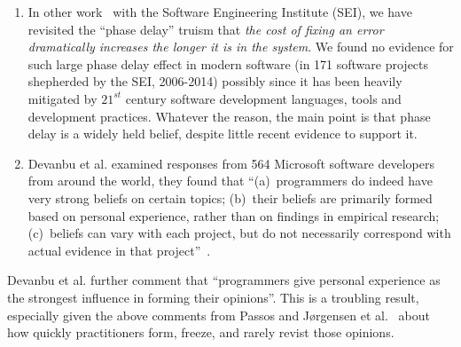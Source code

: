 \documentclass{sig-alternate}
\theoremstyle{break}
\begin{document}
\begin{enumerate} 
\item
In other work~\cite{me16phase} with the Software Engineering Institute (SEI), we have revisited
the ``phase delay'' truism that {\em the cost of fixing an error dramatically increases the longer it is in the system}. 
We found no evidence for such large   phase delay effect in modern
software (in 171 software projects shepherded
by the SEI, 2006-2014) possibly since it has been  heavily mitigated by $21^{st}$ century software development languages, tools and development practices. 
Whatever the reason, the main point  is that phase delay is a widely
held belief, despite little recent evidence to support it.
\item
Devanbu et al.  examined responses from 564 Microsoft software developers from around
the world, they found that  ``(a)~programmers do indeed have very
strong beliefs on certain topics; (b)~their beliefs are primarily formed
based on personal experience, rather than on findings in empirical
research; (c)~beliefs can vary with each project, but do not necessarily
correspond with actual evidence in that project''~\cite{prem16}.
\end{enumerate}
Devanbu et al. further  comment that ``programmers give personal experience
as the strongest influence in forming their opinions''. This is a troubling
result, especially given the above comments from Passos and  J{\o}rgensen et al.~\cite{passos11,jorgensen09} about how quickly practitioners form, freeze, and rarely revist those opinions.




\end{document}
